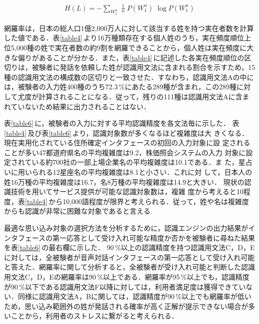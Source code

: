 \begin{eqnarray}
H(L) = -\sum_{W_{1}^{n}}\;\frac{1}{n}\;P(W_{1}^{n})\;\log P(W_{1}^{n})
\end{eqnarray}

網羅率は，日本の総人口1億2,000万人に対して該当する姓を持つ実在者数を計算した値である．表\ref{table4}\,より16万種類存在する個人姓のうち，実在頻度順位上位5,000種の姓で実在者数の約9割を網羅できることから，個人姓は実在頻度に大きな偏りがあることが分かる．また，表\ref{table4}\,に記述した各実在頻度順位の区切りは，被験者に発話を依頼した姓が認識用文法に含まれる割合を示すため，15種の認識用文法の構成数の区切りと一致させた．すなわち，認識用文法Aの中には，被験者の入力姓400種のうち72.3\,\%にあたる289種が含まれ，この289種に対して尤度が計算されることになる．従って，残りの111種は認識用文法Aに含まれていないため結果に出力されることはない．

表\ref{table6}\,に，被験者の入力に対する平均認識精度を各文法毎に示した．
表\ref{table4}\,及び表\ref{table6}\,より，認識対象数が多くなるほど複雑度は大
きくなる．現在実用化されている住所確定インタフェースの初回の入力対象に設
定されることが多い47都道府県名の平均複雑度は9.2，株価照会システムの入力
対象に設定されている約700社の一部上場企業名の平均複雑度は10.1である．ま
た，星占いに用いられる12星座名の平均複雑度は8.1と小さい．これに対
して，日本人の姓16万種の平均複雑度は16.7，名8万種の平均複雑度は14.9と大きい．
現状の認識技術を用いてサービス提供が可能な認識対象数は，複雑
度から考えると10程度，表\ref{table4}\,から10,000語程度が限界と考えられる．従って，姓や名は複雑度からも認識が非常に困難な対象であると言える.

最適な思い込み対象の選択方法を分析するために，認識エンジンの出力結果がインタフェースの第一応答として受け入れ可能な精度か否かを被験者に尋ねた結果を表\ref{table6}\,の最右欄に示した．
90\,\%以上の認識精度を持つ認識用文法C，D，Eに対しては，全被験者が音声対話インタフェースの第一応答として受け入れ可能と答えた．網羅率に関して分析すると，全被験者が受け入れ可能と判断した認識用文法C，D，Eの網羅率は90\,\%以上である．網羅率が95\,\%以上でも，認識精度が90\,\%以下である認識用文法F以降に対しては，利用者満足度は獲得できていない．同様に認識用文法A，Bに関しては，認識精度が90\,\%以上でも網羅率が低いため，思い込み範囲外の姓が発話される確率が高く正解が提示できない場合が多いことから，利用者のストレスに繋がると考えられる．

